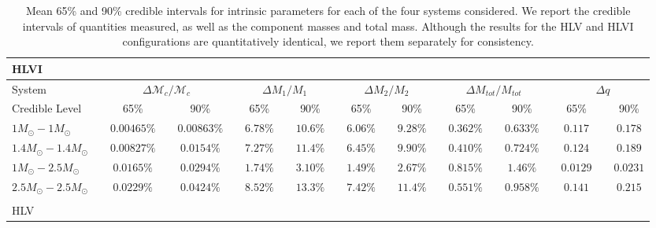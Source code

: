 \documentclass[11pt,a4paper]{emulateapj} 
\newcommand{\chmass}{\mathcal{M}_c}
\begin{document}
\begin{table}[t!]
\centering
\caption{Mean 65\% and 90\% credible intervals for intrinsic parameters for
  each of the four systems considered.  We report the credible
  intervals of quantities measured, as well as the component masses
  and total mass.  Although the results for the HLV and HLVI
  configurations are quantitatively identical, we report them
  separately for consistency.}
  \tabcolsep=0.11cm
      {\renewcommand{\arraystretch}{1.3} 
\begin{tabular}{lcccccccccccccccccccc}

\\HLVI\\

 \hline\hline System & \vline & \multicolumn{3}{c}{$\Delta \chmass / \chmass$} &
\vline & \multicolumn{3}{c}{$\Delta M_1 / M_1$} & \vline & \multicolumn{3}{c}{$\Delta M_2 / M_2$} & \vline &
\multicolumn{3}{c}{$\Delta M_{tot}/M_{tot}$} & \vline & \multicolumn{3}{c}{$\Delta q$}\\ \hline
Credible Level & \vline & 65\% & \vline & 90\% & \vline & 65\% & \vline & 90\% & \vline & 65\% & \vline & 90\% & \vline & 65\% & \vline & 90\% & \vline & 65\% & \vline & 90\% \\
\hline\hline

$1M_{\odot}-1M_{\odot}$ & \vline &$0.00465\%$ & \vline &$0.00863\%$ & \vline & $6.78\%$ & \vline &$10.6\%$ & \vline & $6.06\%$ & \vline &$9.28\%$ & \vline & $0.362\%$ & \vline &$0.633\%$ & \vline & $0.117$ & \vline &$0.178$\\\hline$1.4M_{\odot}-1.4M_{\odot}$ & \vline &$0.00827\%$ & \vline &$0.0154\%$ & \vline & $7.27\%$ & \vline &$11.4\%$ & \vline & $6.45\%$ & \vline &$9.90\%$ & \vline & $0.410\%$ & \vline &$0.724\%$ & \vline & $0.124$ & \vline &$0.189$\\\hline$1M_{\odot}-2.5M_{\odot}$ & \vline &$0.0165\%$ & \vline &$0.0294\%$ & \vline & $1.74\%$ & \vline &$3.10\%$ & \vline & $1.49\%$ & \vline &$2.67\%$ & \vline & $0.815\%$ & \vline &$1.46\%$ & \vline & $0.0129$ & \vline &$0.0231$\\\hline$2.5M_{\odot}-2.5M_{\odot}$ & \vline &$0.0229\%$ & \vline &$0.0424\%$ & \vline & $8.52\%$ & \vline &$13.3\%$ & \vline & $7.42\%$ & \vline &$11.4\%$ & \vline & $0.551\%$ & \vline &$0.958\%$ & \vline & $0.141$ & \vline &$0.215$\\

\hline
\hline

\\ HLV\\


\end{tabular}}
\end{table}
\end{document}
